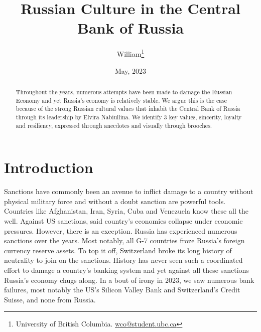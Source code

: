 \documentclass[12pt]{article}
\title{ \vspace*{-2.5cm} \hspace*{-0.5cm}Russian Culture in the Central Bank of Russia}
\author{William\thanks{University of British Columbia.
\href{mailto:TK@TK.edu}{wco@student.ubc.ca}}}
\date{ \vspace*{0.5cm} May, 2023\\
}
\begin{document}
\nocite{*}
\bgroup
\let\footnoterule\relax

\begin{singlespace}
\maketitle


\begin{abstract}
    \noindent Throughout the years, numerous attempts have been made to damage the Russian Economy and yet Russia's economy is relatively stable. We argue this is the case because of the strong Russian cultural values that inhabit the Central Bank of Russia through its leadership by Elvira Nabiullina. We identify 3 key values, sincerity, loyalty and resiliency, expressed through anecdotes and visually through brooches. 
\end{abstract}
\end{singlespace}
\thispagestyle{empty}

\clearpage
\egroup
\setcounter{page}{1}



\section{Introduction 
\label{sec:Introduction}}

Sanctions have commonly been an avenue to inflict damage to a country without physical military force and without a doubt sanction are powerful tools. Countries like Afghanistan, Iran, Syria, Cuba and Venezuela know these all the well. Against US sanctions, said country’s economies collapse under economic pressures. However, there is an exception. Russia has experienced numerous sanctions over the years. Most notably, all G-7 countries froze Russia’s foreign currency reserve assets. To top it off, Switzerland broke its long history of neutrality to join on the sanctions. History has never seen such a coordinated effort to damage a country’s banking system and yet against all these sanctions Russia’s economy chugs along. In a bout of irony in 2023, we saw numerous bank failures, most notably the US’s Silicon Valley Bank and Switzerland’s Credit Suisse, and none from Russia. 
\end{document}
